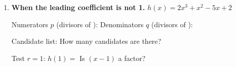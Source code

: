 \documentclass[10pt]{article}
\begin{document}
\begin{tcolorbox}[colback=white, colframe=black!40, title=\textbf{Tier R --- Remediate},
    fonttitle=\bfseries, arc=1.5mm, left=3mm, right=3mm, top=2mm, bottom=2mm, breakable]
\begin{enumerate}[leftmargin=1.7em, itemsep=9pt]
    \vspace{2pt}
    Depressed polynomial: \blank{2.8cm} \qquad $g(x) = $ \blank{4.6cm}

    \vspace{2pt}
    Zeros: \blank{3.4cm}

    \vspace{2pt}
    In Lesson 3.2 you could have factored this one by \emph{grouping}. Show that route in one line:
    \blank{5.4cm}

  \item \textbf{When the leading coefficient is not 1.} $h(x) = 2x^3 + x^2 - 5x + 2$

    \vspace{2pt}
    Numerators $p$ (divisors of \blank{0.8cm}): \blank{2.2cm} \qquad
    Denominators $q$ (divisors of \blank{0.8cm}): \blank{2.2cm}

    \vspace{2pt}
    Candidate list: \blank{5.0cm} \; How many candidates are there? \blank{1.2cm}

    \vspace{2pt}
    Test $r = 1$: $h(1) = $ \blank{1.4cm} \; Is $(x-1)$ a factor? \blank{1.2cm}
\end{enumerate}
\end{tcolorbox}
\end{document}
